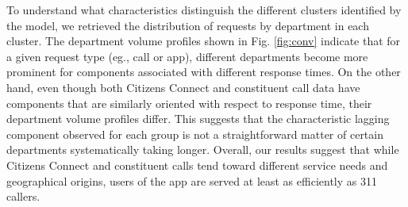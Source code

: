 \documentclass[twoside]{article}
\theoremstyle{theorem}
\theoremstyle{theorem}
\theoremstyle{theorem}
\theoremstyle{lemma}
\theoremstyle{definition}
\theoremstyle{example}
\begin{document}
To understand what characteristics distinguish the different clusters identified by the model, we retrieved the distribution of requests by department in each cluster. The department volume profiles shown in Fig. \ref{fig:conv} indicate that for a given request type (eg., call or app), different departments become more prominent for components associated with different response times. On the other hand, even though both Citizens Connect and constituent call data have components that are similarly oriented with respect to response time, their department volume profiles differ. This suggests that the characteristic lagging component observed for each group is not a straightforward matter of certain departments systematically taking longer.  Overall, our results suggest that while Citizens Connect and constituent calls tend toward different service needs and geographical origins, users of the app are served at least as efficiently as 311 callers.




\end{document}
